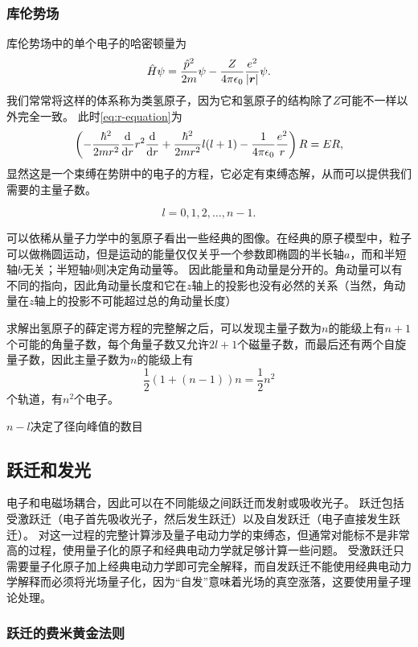 \documentclass[UTF8, a4paper]{ctexart}
\begin{document}
\subsubsection{库伦势场}

库伦势场中的单个电子的哈密顿量为
\begin{equation}
    \hat{H} \psi = \frac{\hat{p}^2}{2m} \psi - \frac{Z}{4\pi \epsilon_0} \frac{e^2}{\abs{\vb*{r}}} \psi.
    \label{eq:columb-electron-hamiltonian}
\end{equation}
我们常常将这样的体系称为类氢原子，因为它和氢原子的结构除了$Z$可能不一样以外完全一致。
此时\eqref{eq:r-equation}为
\[
    \left( - \frac{\hbar^2}{2m r^2} \dv{r} r^2 \dv{r} + \frac{\hbar^2}{2m r^2} l(l+1) - \frac{1}{4\pi \epsilon_0} \frac{e^2}{r} \right) R = E R,
\]
显然这是一个束缚在势阱中的电子的方程，它必定有束缚态解，从而可以提供我们需要的主量子数。


\[
    l = 0, 1, 2, \ldots, n-1.
\]

可以依稀从量子力学中的氢原子看出一些经典的图像。在经典的原子模型中，粒子可以做椭圆运动，但是运动的能量仅仅关乎一个参数即椭圆的半长轴$a$，而和半短轴$b$无关；半短轴$b$则决定角动量等。
因此能量和角动量是分开的。角动量可以有不同的指向，因此角动量长度和它在$z$轴上的投影也没有必然的关系（当然，角动量在$z$轴上的投影不可能超过总的角动量长度）

求解出氢原子的薛定谔方程的完整解之后，可以发现主量子数为$n$的能级上有$n+1$个可能的角量子数，每个角量子数又允许$2l+1$个磁量子数，而最后还有两个自旋量子数，因此主量子数为$n$的能级上有
\[
    \frac{1}{2} (1 + (n-1)) n = \frac{1}{2}n^2
\]
个轨道，有$n^2$个电子。

$n-l$决定了径向峰值的数目

\subsection{跃迁和发光}

电子和电磁场耦合，因此可以在不同能级之间跃迁而发射或吸收光子。
跃迁包括受激跃迁（电子首先吸收光子，然后发生跃迁）以及自发跃迁（电子直接发生跃迁）。
对这一过程的完整计算涉及量子电动力学的束缚态，但通常对能标不是非常高的过程，使用量子化的原子和经典电动力学就足够计算一些问题。
受激跃迁只需要量子化原子加上经典电动力学即可完全解释，而自发跃迁不能使用经典电动力学解释而必须将光场量子化，因为“自发”意味着光场的真空涨落，这要使用量子理论处理。

\subsubsection{跃迁的费米黄金法则}
\end{document}

